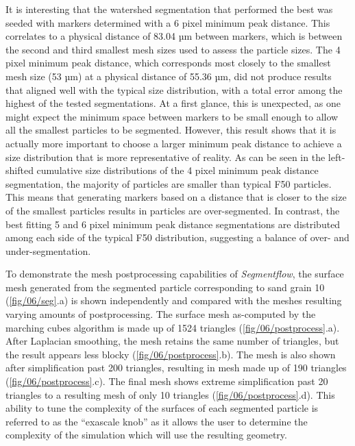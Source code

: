 It is interesting that the watershed segmentation that performed the best was
seeded with markers determined with a 6 pixel minimum peak distance. This
correlates to a physical distance of 83.04 µm between markers,
which is between the second and
third smallest mesh sizes used to assess the particle sizes.
The 4 pixel minimum peak distance, which corresponds most closely to the
smallest mesh size (53 µm) at a physical distance of 55.36 µm, did not
produce results that aligned well with the typical size distribution, with
a total error among the highest of the tested segmentations. At a first glance,
this is unexpected, as one might expect the minimum space between markers to
be small enough to allow all the smallest particles to be segmented. However,
this result shows that it is actually more important to choose a larger
minimum peak distance to achieve a size distribution that is more
representative of reality. As can be seen in the left-shifted cumulative size
distributions of the 4 pixel minimum peak distance segmentation, the majority
of particles are smaller than typical F50 particles.
This means that generating markers based on a
distance that is closer to the size of the smallest particles results in
particles are over-segmented.
In contrast, the best fitting 5 and 6 pixel minimum peak distance segmentations
are distributed among each side of the typical F50 distribution, suggesting
a balance of over- and under-segmentation.

To demonstrate the mesh postprocessing capabilities of \textit{Segmentflow},
the surface mesh generated from the segmented particle corresponding to sand
grain 10 (\ref{fig/06/seg}.a) is shown independently and compared with
the meshes resulting varying amounts of postprocessing. The surface mesh
as-computed by the marching cubes algorithm is made up of 1524 triangles
(\ref{fig/06/postprocess}.a). After Laplacian smoothing, the mesh
retains the same number of triangles, but the result appears less blocky
(\ref{fig/06/postprocess}.b). The mesh is also shown after
simplification past 200 triangles, resulting in mesh made up of 190 triangles
(\ref{fig/06/postprocess}.c). The final mesh shows extreme
simplification past 20 triangles to a resulting mesh of only 10 triangles
(\ref{fig/06/postprocess}.d). This ability to tune the complexity of
the surfaces of each segmented particle is referred to as the
``exascale knob'' as it allows the user to determine the complexity of the
simulation which will use the resulting geometry.

